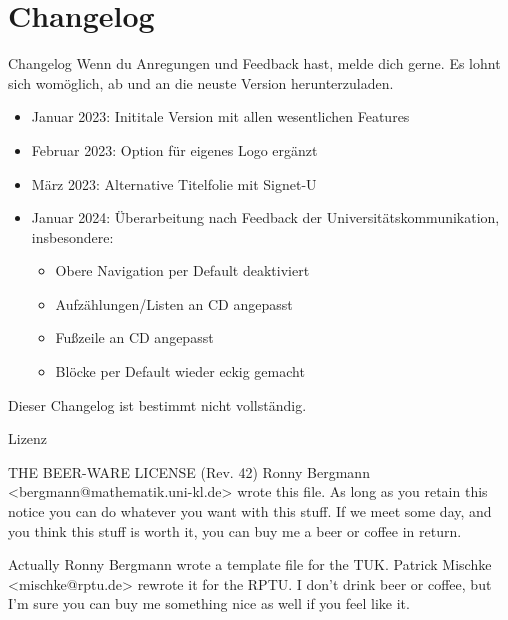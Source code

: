 \documentclass[german,10pt,xcolor=colortbl,compress
]{beamer}
\begin{document}
\section{Changelog}
\begin{frame}{Changelog}
	Wenn du Anregungen und Feedback hast, melde dich gerne. Es lohnt sich womöglich, ab und an die neuste Version herunterzuladen.
	\begin{itemize}
		\item Januar 2023: Inititale Version mit allen wesentlichen Features
		\item Februar 2023: Option für eigenes Logo ergänzt
		\item März 2023: Alternative Titelfolie mit Signet-U
		\item Januar 2024: Überarbeitung nach Feedback der Universitätskommunikation, insbesondere:
		      \begin{itemize}
			      \item Obere Navigation per Default deaktiviert
			      \item Aufzählungen/Listen an CD angepasst
			      \item Fußzeile an CD angepasst
			      \item Blöcke per Default wieder eckig gemacht
		      \end{itemize}
	\end{itemize}
	Dieser Changelog ist bestimmt nicht vollständig.
\end{frame}
\begin{frame}{Lizenz}
	\begin{block}{THE BEER-WARE LICENSE (Rev. 42)}
		Ronny Bergmann <bergmann@mathematik.uni-kl.de> wrote this file. As long as
		you retain this notice you can do whatever you want with this stuff. If we
		meet some day, and you think this stuff is worth it, you can buy me a beer
		or coffee in return.\par\vspace*{1ex}
		Actually Ronny Bergmann wrote a template file for the TUK. Patrick Mischke
		<mischke@rptu.de> rewrote it for the RPTU. I don't drink beer or coffee,
		but I'm sure you can buy me something nice as well if you feel like it.
	\end{block}
\end{frame}
\end{document}
